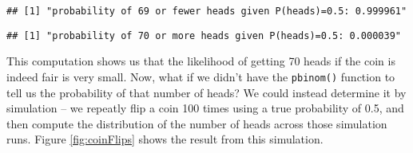 \documentclass[]{book}
\newenvironment{Shaded}{\begin{snugshade}}{\end{snugshade}}
\newcommand{\KeywordTok}[1]{\textcolor[rgb]{0.13,0.29,0.53}{\textbf{#1}}}
\newcommand{\DecValTok}[1]{\textcolor[rgb]{0.00,0.00,0.81}{#1}}
\newcommand{\FloatTok}[1]{\textcolor[rgb]{0.00,0.00,0.81}{#1}}
\newcommand{\StringTok}[1]{\textcolor[rgb]{0.31,0.60,0.02}{#1}}
\newcommand{\CommentTok}[1]{\textcolor[rgb]{0.56,0.35,0.01}{\textit{#1}}}
\newcommand{\ControlFlowTok}[1]{\textcolor[rgb]{0.13,0.29,0.53}{\textbf{#1}}}
\newcommand{\OperatorTok}[1]{\textcolor[rgb]{0.81,0.36,0.00}{\textbf{#1}}}
\newcommand{\NormalTok}[1]{#1}
\theoremstyle{definition}
\theoremstyle{definition}
\theoremstyle{definition}
\theoremstyle{remark}
\begin{document}
\begin{verbatim}
## [1] "probability of 69 or fewer heads given P(heads)=0.5: 0.999961"
\end{verbatim}

\begin{Shaded}
\end{Shaded}

\begin{verbatim}
## [1] "probability of 70 or more heads given P(heads)=0.5: 0.000039"
\end{verbatim}

This computation shows us that the likelihood of getting 70 heads if the
coin is indeed fair is very small. Now, what if we didn't have the
\texttt{pbinom()} function to tell us the probability of that number of
heads? We could instead determine it by simulation -- we repeatly flip a
coin 100 times using a true probability of 0.5, and then compute the
distribution of the number of heads across those simulation runs. Figure
\ref{fig:coinFlips} shows the result from this simulation.

\begin{Shaded}
\end{Shaded}
\end{document}
